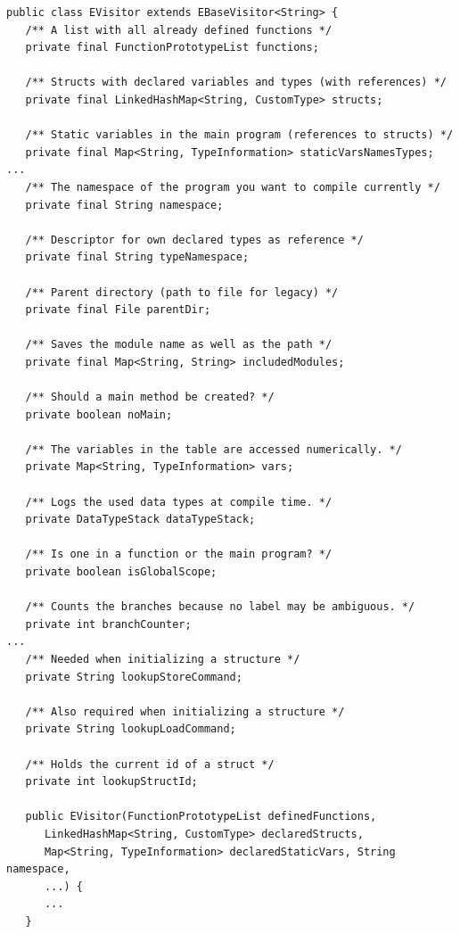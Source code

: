 \begin{lstlisting}[frame=htrbl, caption={Implementation of {\ttfamily EVisitor.java}}, label={lst:visitor}, basicstyle=\footnotesize]
public class EVisitor extends EBaseVisitor<String> {
   /** A list with all already defined functions */
   private final FunctionPrototypeList functions;

   /** Structs with declared variables and types (with references) */
   private final LinkedHashMap<String, CustomType> structs;

   /** Static variables in the main program (references to structs) */
   private final Map<String, TypeInformation> staticVarsNamesTypes;
...
   /** The namespace of the program you want to compile currently */
   private final String namespace;

   /** Descriptor for own declared types as reference */
   private final String typeNamespace;

   /** Parent directory (path to file for legacy) */
   private final File parentDir;

   /** Saves the module name as well as the path */
   private final Map<String, String> includedModules;

   /** Should a main method be created? */
   private boolean noMain;

   /** The variables in the table are accessed numerically. */
   private Map<String, TypeInformation> vars;

   /** Logs the used data types at compile time. */
   private DataTypeStack dataTypeStack;

   /** Is one in a function or the main program? */
   private boolean isGlobalScope;

   /** Counts the branches because no label may be ambiguous. */
   private int branchCounter;
...
   /** Needed when initializing a structure */
   private String lookupStoreCommand;

   /** Also required when initializing a structure */
   private String lookupLoadCommand;
   
   /** Holds the current id of a struct */
   private int lookupStructId;

   public EVisitor(FunctionPrototypeList definedFunctions, 
      LinkedHashMap<String, CustomType> declaredStructs, 
      Map<String, TypeInformation> declaredStaticVars, String namespace, 
      ...) {
      ...
   }


\end{lstlisting}

